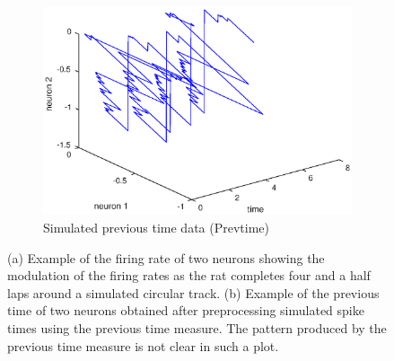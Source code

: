 \begin{figure}[tbh]
\begin{subfigure}[b]{0.475\textwidth}
            \label{fig:Prevtime in 3D}
        \end{subfigure}
        \hfill
        \begin{subfigure}[b]{0.475\textwidth}  
            \centering 
            \includegraphics[width=\textwidth]{./images/SimPrevtime_with_time.eps}
            \caption[]%
            {{\small Simulated previous time data (Prevtime)}}  
            \label{fig:Sim animal position in 3D}
        \end{subfigure}
        \caption[]%
         {\small  (a) Example of the firing rate of two neurons showing the modulation of the firing rates as the rat completes four and a half laps around a simulated circular track.
         (b) Example of the previous time of two neurons obtained after preprocessing  simulated spike times using  the 
         previous time measure. The pattern produced by the previous time measure is not clear in such a plot.} 
         
         \label{fig:Simulated_datasets}
\end{figure}
        
       
 
